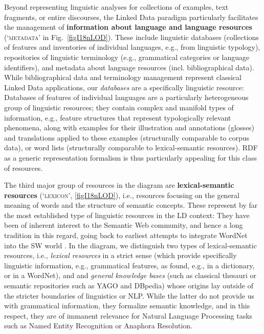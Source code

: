 Beyond representing linguistic analyses for collections of examples, text fragments, or entire discourses, 
the Linked Data paradigm particularly facilitates the management of \textbf{information about language and language resources} (`\textsc{metadata}' in Fig.\ \ref{figI18nLOD}).
These include linguistic databases (collections of features and inventories of individual languages, e.g., from linguistic typology), repositories of linguistic terminology (e.g., grammatical categories or language identifiers), and metadata about language resources (incl. bibliographical data).
While bibliographical data and terminology management represent classical Linked Data applications, our \emph{databases} are a specifically linguistic resource:
Databases of features of individual languages are a particularly heterogeneous group of linguistic resources; they contain complex and manifold types of information, e.g., feature structures that represent typologically relevant phenomena, along with examples for their illustration and annotations (glosses) and translations applied to these examples (structurally comparable to corpus data), or word lists (structurally comparable to lexical-semantic resources). RDF as a generic representation formalism is thus particularly appealing for this class of resources.

The third major group of resources in the diagram are \textbf{lexical-semantic resources} (`\textsc{lexicon}', \ref{figI18nLOD}), i.e., resources focusing on the general meaning of words and the structure of semantic concepts. 
These represent by far the most established type of linguistic resources in the LD context: They have been of inherent interest to the Semantic Web community, and hence a long tradition in this regard, going back to earliest attempts to integrate WordNet into the SW world \citep{gangemi2003ontowordnet}. 
In the diagram, we distinguish two types of lexical-semantic resources, i.e., \emph{lexical resources} in a strict sense (which provide specifically linguistic information, e.g., grammatical features, as found, e.g., in a dictionary, or in a WordNet), and and \emph{general knowledge bases} (such as classical thesauri or semantic repositories such as YAGO and DBpedia) 
whose origins lay outside of the stricter boundaries of linguistics or NLP. 
While the latter do not provide us with grammatical information, they formalize semantic knowledge, and in this respect, they are of immanent relevance for Natural Language Processing tasks such as Named Entity Recognition or Anaphora Resolution. 

